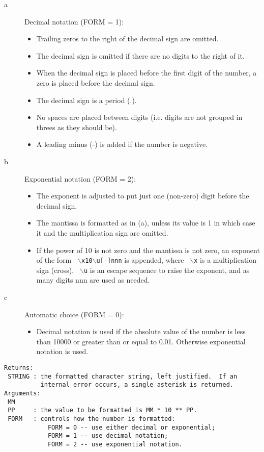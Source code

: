 \begin{description}
\item[a] Decimal notation (FORM = 1):
\begin{itemize}
\item    Trailing zeros to the right of the decimal sign are omitted.
\item    The decimal sign is omitted if there are no digits to the
         right of it.
\item    When the decimal sign is placed before the first digit of the
         number, a zero is placed before the decimal sign.
\item    The decimal sign is a period (.).
\item    No spaces are placed between digits (i.e. digits are not
         grouped in threes as they should be).
\item    A leading minus (-) is added if the number is negative. 
\end{itemize}
\item[b] Exponential notation (FORM = 2):
\begin{itemize}
\item    The exponent is adjusted to put just one (non-zero) digit
         before the decimal sign. 
\item    The mantissa is formatted as in (a), unless its value is 1 in
         which case it and the multiplication sign are omitted. 
\item    If the power of 10 is not zero and the mantissa is not zero,
         an exponent of the form {\tt
         $\backslash$x10$\backslash$u[-]nnn} is appended, where {\tt
         $\backslash$x} is a multiplication sign (cross), {\tt
         $\backslash$u} is an escape sequence to raise the exponent,
         and as many digits nnn are used as needed.
\end{itemize}
\item[c] Automatic choice (FORM = 0):
\begin{itemize}
\item    Decimal notation is used if the absolute value of the number
         is less than 10000 or greater than or equal to 0.01.
         Otherwise exponential notation is used. 
\end{itemize}
\end{description}

\begin{verbatim}
Returns:
 STRING : the formatted character string, left justified.  If an
          internal error occurs, a single asterisk is returned.
Arguments:
 MM
 PP     : the value to be formatted is MM * 10 ** PP.
 FORM   : controls how the number is formatted:
            FORM = 0 -- use either decimal or exponential;
            FORM = 1 -- use decimal notation;
            FORM = 2 -- use exponential notation.
\end{verbatim}

